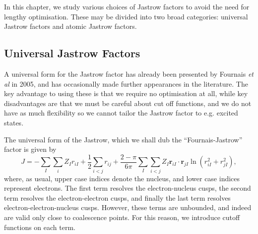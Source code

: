In this chapter, we study various choices of Jastrow factors to avoid the need for lengthy optimisation. These may be divided into two broad categories: universal Jastrow factors and atomic Jastrow factors.

\subsection{Universal Jastrow Factors}

A universal form for the Jastrow factor has already been presented by Fournais \emph{et al} in 2005,\supercite{fournaisSharp2005} and has occasionally made further appearances in the literature.\supercite{tewSecond2008,szenesStriking2024} The key advantage to using these is that we require no optimisation at all, while key disadvantages are that we must be careful about cut off functions, and we do not have as much flexibility so we cannot tailor the Jastrow factor to e.g. excited states.

The universal form of the Jastrow, which we shall dub the ``Fournais-Jastrow'' factor is given by\supercite{fournaisSharp2005,fournaisNonIsotropic2007}
\begin{equation}
    \label{eq:fournais-full}
    J = -\sum_I\sum_i Z_Ir_{iI} + \frac 12\sum_{i<j}r_{ij} + \frac{2-\pi}{6\pi}\sum_I\sum_{i<j}Z_I\bm r_{iI}\cdot \bm r_{jI}\ln(r_{iI}^2+r_{jI}^2),
\end{equation}
where, as usual, upper case indices denote the nucleus, and lower case indices represent electrons. The first term resolves the electron-nucleus cusps, the second term resolves the electron-electron cusps, and finally the last term resolves electron-electron-nucleus cusps. However, these terms are unbounded, and indeed are valid only close to coalescence points. For this reason, we introduce cutoff functions on each term.

